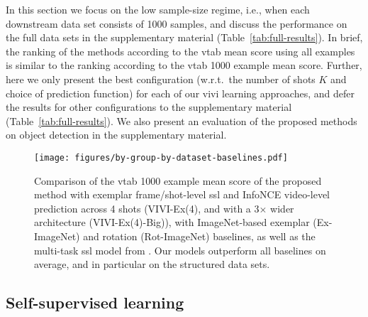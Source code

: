 \documentclass[10pt,twocolumn,letterpaper]{article}
\begin{document}
In this section we focus on the low sample-size regime, i.e., when each downstream data set consists of 1000 samples, and discuss the performance on the full data sets in the supplementary material (Table~\ref{tab:full-results}). In brief, the ranking of the methods according to the \gls{vtab} mean score using all examples is similar to the ranking according to the \gls{vtab} 1000 example mean score. Further, here we only present the best configuration (w.r.t.\ the number of shots $K$ and choice of prediction function) for each of our \gls{vivi} learning approaches, and defer the results for other configurations to the supplementary material (Table~\ref{tab:full-results}). We also present an evaluation of the proposed methods on object detection in the supplementary material.

\begin{figure*}[t!]
\vspace{-0.2cm}
\centering
\texttt{[image: figures/by-group-by-dataset-baselines.pdf]}
\vspace{-0.2cm}
\caption{Comparison of the \gls{vtab} 1000 example mean score of the proposed method with exemplar frame/shot-level \gls{ssl} and InfoNCE video-level prediction across 4 shots (VIVI-Ex(4), and with a 3$\times$ wider architecture (VIVI-Ex(4)-Big)), with ImageNet-based exemplar (Ex-ImageNet) and rotation (Rot-ImageNet) baselines, as well as the multi-task \gls{ssl} model from \cite{doersch2017multi}. Our models outperform all baselines on average, and in particular on the structured data sets.}
\label{fig:baselines}
\end{figure*}

\subsection{Self-supervised learning}
\end{document}

